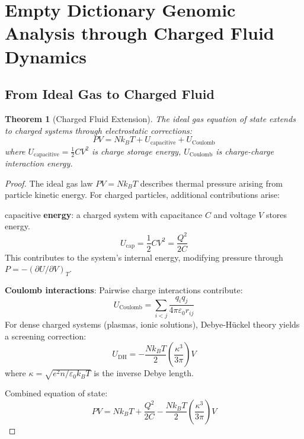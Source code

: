 \documentclass[11pt,a4paper]{article}
\newtheorem{theorem}{Theorem}[section]
\theoremstyle{remark}
\begin{document}
\section{Empty Dictionary Genomic Analysis through Charged Fluid Dynamics}

\subsection{From Ideal Gas to Charged Fluid}

\begin{theorem}[Charged Fluid Extension]
\label{thm:charged_fluid_extension}
The ideal gas equation of state extends to charged systems through electrostatic corrections:
\begin{equation}
PV = Nk_BT + U_{\text{capacitive}} + U_{\text{Coulomb}}
\end{equation}
where $U_{\text{capacitive}} = \frac{1}{2}CV^2$ is charge storage energy, $U_{\text{Coulomb}}$ is charge-charge interaction energy.
\end{theorem}

\begin{proof}
The ideal gas law $PV = Nk_BT$ describes thermal pressure arising from particle kinetic energy. For charged particles, additional contributions arise:

capacitive \textbf{ energy}: a charged system with capacitance $C$ and voltage $V$ stores energy.
\begin{equation}
U_{\text{cap}} = \frac{1}{2}CV^2 = \frac{Q^2}{2C}
\end{equation}
This contributes to the system's internal energy, modifying pressure through $P = -(\partial U/\partial V)_T$.

\textbf{Coulomb interactions}: Pairwise charge interactions contribute:
\begin{equation}
U_{\text{Coulomb}} = \sum_{i<j} \frac{q_i q_j}{4\pi\varepsilon_0 r_{ij}}
\end{equation}
For dense charged systems (plasmas, ionic solutions), Debye-Hückel theory yields a screening correction:
\begin{equation}
U_{\text{DH}} = -\frac{Nk_BT}{2}\left(\frac{\kappa^3}{3\pi}\right)V
\end{equation}
where $\kappa = \sqrt{e^2n/\varepsilon_0 k_BT}$ is the inverse Debye length.

Combined equation of state:
\begin{equation}
PV = Nk_BT + \frac{Q^2}{2C} - \frac{Nk_BT}{2}\left(\frac{\kappa^3}{3\pi}\right)V
\end{equation}
\end{proof}
\end{document}
